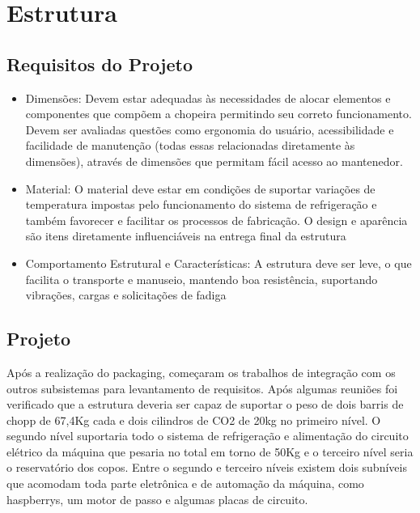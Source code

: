 \chapter[Estrutura]{Estrutura}

\section{Requisitos do Projeto}


\begin{itemize}

\item{Dimensões: Devem estar adequadas às necessidades de alocar elementos e componentes que compõem a chopeira permitindo seu correto funcionamento. Devem ser avaliadas questões como ergonomia do usuário, acessibilidade e facilidade de manutenção (todas essas relacionadas diretamente às dimensões), através de dimensões que permitam fácil acesso ao mantenedor.}

\item{Material: O material deve estar em condições de suportar variações de temperatura impostas pelo funcionamento do sistema de refrigeração e também favorecer e facilitar os processos de fabricação. O design e aparência são itens diretamente influenciáveis na entrega final da estrutura}

\item{Comportamento Estrutural e Características: A estrutura deve ser leve, o que facilita o transporte e manuseio, mantendo boa resistência, suportando vibrações, cargas e solicitações de fadiga}

\end{itemize}

\section{Projeto}

Após a realização do packaging, começaram os trabalhos de integração com os outros subsistemas para levantamento de requisitos. Após algumas reuniões foi verificado que a estrutura deveria ser capaz de suportar o peso de dois barris de chopp de 67,4Kg cada e dois cilindros de CO2 de 20kg no primeiro nível. O segundo nível suportaria todo o sistema de refrigeração e alimentação do circuito elétrico da máquina que pesaria no total em torno de 50Kg e o terceiro nível seria o reservatório dos copos. Entre o segundo e terceiro níveis existem dois subníveis que acomodam toda parte eletrônica e de automação da máquina, como haspberrys, um motor de passo e algumas placas de circuito.

